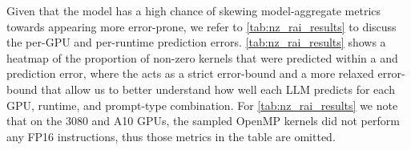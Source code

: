 Given that the \gptoss model has a high chance of skewing model-aggregate metrics towards appearing more error-prone, we refer to \autoref{tab:nz_rai_results} to discuss the per-GPU and per-runtime prediction errors.
\autoref{tab:nz_rai_results} shows a heatmap of the proportion of non-zero \rai kernels that were predicted within a \pmten and \pmfifty \rai prediction error, where the \pmten acts as a strict error-bound and \pmfifty a more relaxed error-bound that allow us to better understand how well each LLM predicts \rai for each GPU, runtime, and prompt-type combination.
For \autoref{tab:nz_rai_results} we note that on the 3080 and A10 GPUs, the sampled OpenMP kernels did not perform any FP16 instructions, thus those metrics in the table are omitted.


% 


